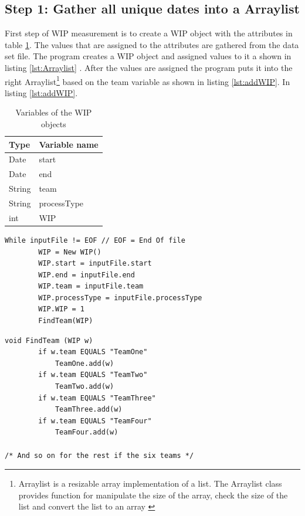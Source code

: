 \documentclass[UKenglish]{ifimaster}  %
\begin{document}
\subsection{Step 1: Gather all unique dates into a Arraylist}
\label{sub:stepOne}
First step of WIP measurement is to create a WIP object with the attributes in table \ref{tab:object}.  The values that are assigned to the attributes are gathered from the data set file.  The program creates a WIP object and assigned values to it a shown in listing \ref{lst:Arraylist} . After the values are assigned the program puts it into the right Arraylist\footnote{Arraylist is a resizable array implementation of a list. The Arraylist class provides function for manipulate the size of the array, check the size of the list and convert the list to an array  \parencite{Arraylist}} based on the team variable as shown in listing \ref{lst:addWIP}. In listing \ref{lst:addWIP}.
\begin{table}[!ht]
\begin{center}
\begin{tabular}{| l | l |}
\hline
Type & Variable name \\ \hline
Date & start \\ \hline
Date & end\\ \hline
String & team\\ \hline
String & processType\\ \hline
int  & WIP\\ \hline
\end{tabular}
\caption{Variables of the WIP objects}
\label{tab:object}
\end{center}
\end{table}


\begin{minipage}{\textwidth} 
 \begin{lstlisting}[caption={Gather all unique dates into Arraylist},label={lst:Arraylist}]
While inputFile != EOF // EOF = End Of file
		WIP = New WIP()
		WIP.start = inputFile.start
		WIP.end = inputFile.end
		WIP.team = inputFile.team
		WIP.processType = inputFile.processType
		WIP.WIP = 1
		FindTeam(WIP)
 \end{lstlisting}
 \end{minipage}
 
 \begin{minipage}{\textwidth} 
 \begin{lstlisting}[caption={Gather WIP object to the right data structure},label={lst:addWIP}]
void FindTeam (WIP w) 
		if w.team EQUALS "TeamOne"
			TeamOne.add(w)
		if w.team EQUALS "TeamTwo"
			TeamTwo.add(w)
		if w.team EQUALS "TeamThree"
			TeamThree.add(w)
		if w.team EQUALS "TeamFour"
			TeamFour.add(w)
				
/* And so on for the rest if the six teams */
 \end{lstlisting}
 \end{minipage}
 
\end{document}
